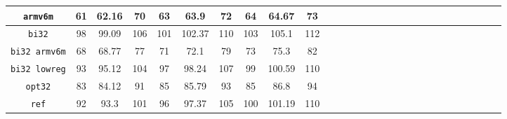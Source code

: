 \begin{landscape}
\begin{table}[]
\begin{adjustbox}{width=600pt}
\begin{tabular}{|c|c|c|c|c|c|c|c|c|c|c|c|c|c|c|c|c|c|c|c|c|c|c|c|c|c|c|c|}
				\hline
				\texttt{armv6m} & 61 & 62.16 & 70 & 63 & 63.9 & 72 & 64 & 64.67 & 73 & & & & & & & & & & & & & & & & & & \\
				\hline
				\texttt{bi32} & 98 & 99.09 & 106 & 101 & 102.37 & 110 & 103 & 105.1 & 112 & & & & & & & & & & & & & & & & & & \\
				\hline
				\texttt{bi32 armv6m} & 68 & 68.77 & 77 & 71 & 72.1 & 79 & 73 & 75.3 & 82 & & & & & & & & & & & & & & & & & & \\
				\hline
				\texttt{bi32 lowreg} & 93 & 95.12 & 104 & 97 & 98.24 & 107 & 99 & 100.59 & 110 & & & & & & & & & & & & & & & & & & \\
				\hline
				\texttt{opt32} & 83 & 84.12 & 91 & 85 & 85.79 & 93 & 85 & 86.8 & 94 & & & & & & & & & & & & & & & & & & \\
				\hline
				\texttt{ref} & 92 & 93.3 & 101 & 96 & 97.37 & 105 & 100 & 101.19 & 110 & & & & & & & & & & & & & & & & & & \\
				\hline
			\end{tabular}
		\end{adjustbox}
	\end{table}
\end{landscape}

